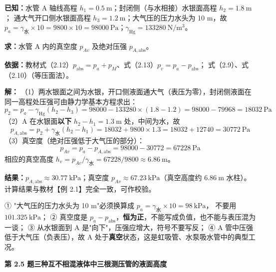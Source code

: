 \begin{jie}
\textbf{已知：}水管 A 轴线高程 $h_1=0.5\ \mathrm{m}$；封闭侧（与水相接）水银面高程 $h_2=1.8\ \mathrm{m}$；
通大气开口侧水银面高程 $h_3=1.2\ \mathrm{m}$；大气压的压力水头为 10 m，故
$p_a=\gamma_{\text{水}}\times10=9800\times10=98000\ \mathrm{Pa}$；$\gamma_{\text{Hg}}=133280\ \mathrm{N/m^3}$。

\textbf{求：}水管 A 内的真空度 $p_{Av}$ 及绝对压强 $p_{A,\text{abs}}$。

\textbf{依据：}教材式（2.12）$p_{\text{abs}}=p_a+p_M$、式（2.13）$p_v=p_a-p_{\text{abs}}$；
式（2.9）、式（2.10）（等压面法）。

\textbf{解：}
（1）两水银面之间为水银，开口侧液面通大气（表压为零），封闭侧液面在同一高程处压强可由静力学基本方程求出：
\[ p_{2}=p_a-\gamma_{\text{Hg}}\left(h_2-h_3\right)=98000-133280\times(1.8-1.2)=98000-79968=18032\ \mathrm{Pa} \]
（2）A 在水银面\textbf{以下} $h_2-h_1=1.3\ \mathrm{m}$ 处，中间为水，故
\[ p_{A,\text{abs}}=p_2+\gamma_{\text{水}}\left(h_2-h_1\right)=18032+9800\times1.3=18032+12740=30772\ \mathrm{Pa} \]
（3）真空度（绝对压强低于大气压的部分）：
\[ p_{Av}=p_a-p_{A,\text{abs}}=98000-30772=67228\ \mathrm{Pa} \]
相应的真空高度 $h_v=p_{Av}/\gamma_{\text{水}}=67228/9800\approx6.86\ \mathrm{m}$。

\textbf{结果：}$p_{A,\text{abs}}\approx30.77\ \mathrm{kPa}$；真空度 $p_{Av}\approx67.23\ \mathrm{kPa}$（真空高度约 $6.86\ \mathrm{m}$ 水柱）。
计算结果与教材【例 2.1】完全一致，可作校验。
\end{jie}

\begin{yicuo}
① "大气压的压力水头为 10 m"必须换算成 $p_a=\gamma_{\text{水}}\times10=98\ \mathrm{kPa}$，
不要用 $101.325\ \mathrm{kPa}$；
② 真空度是 $p_a-p_{\text{abs}}$，\textbf{恒为正}，不能写成负值，也不能与表压混为一谈；
③ 从水银面到 A 是"向下"，压强应增大，符号不要写反；
④ A 管中压强低于大气压（负表压），故 A 处于\textbf{真空}状态，这是虹吸管、水泵吸水管中的典型工况。
\end{yicuo}

\noindent\textbf{第 2.5 题\quad 三种互不相混液体中三根测压管的液面高度}

